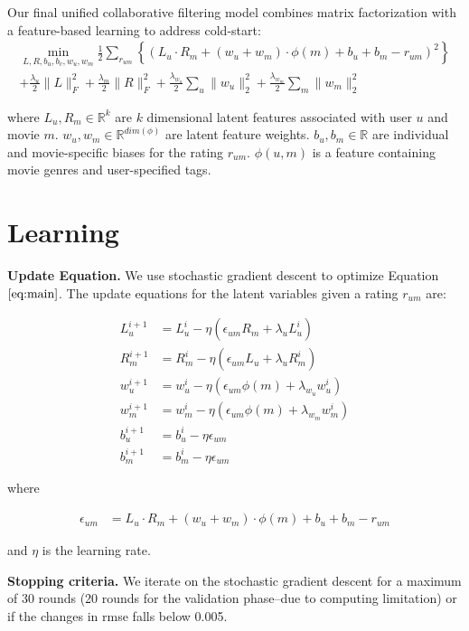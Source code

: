 \documentclass{article} %
\begin{document}
	Our final unified collaborative filtering model combines matrix factorization with a feature-based learning to address cold-start:
	\begin{multline}
	\min_{L, R, b_u, b_v, w_u, w_m} \frac{1}{2}\sum_{r_{um}} \left\{(L_u \cdot R_m + (w_u + w_m) \cdot \phi(m) + b_u + b_m - r_{um})^2\right\}\\ + \frac{\lambda_u}{2}\|L\|^2_F + \frac{\lambda_m}{2}\|R\|^2_F + \frac{\lambda_{w_u}}{2}\sum_u\|w_u\|^2_2 + \frac{\lambda_{w_m}}{2}\sum_m\|w_m\|^2_2\label{eq:main}
	\end{multline}

	where $L_u, R_m \in \mathbb{R}^k$ are $k$ dimensional latent features associated with user $u$ and movie $m$. $w_u,w_m \in \mathbb{R}^{dim(\phi)}$ are latent feature weights. $b_u, b_m \in \mathbb{R}$ are individual and movie-specific biases for the rating $r_{um}$. $\phi(u, m)$ is a feature containing movie genres and user-specified tags.

\section{Learning}

  \textbf{Update Equation.}   We use stochastic gradient descent to optimize
Equation $\ref{eq:main}$. The update equations for the latent variables given
a rating $r_{um}$ are:

	\begin{align}
	L_u^{i+1} &= L_u^{i} - \eta ( \epsilon_{um} R_m  + \lambda_u L_u^i)\\
	R_m^{i+1} &= R_m^{i} - \eta ( \epsilon_{um} L_u  + \lambda_u R_m^i)\\
	w_u^{i+1} &= w_u^{i} - \eta ( \epsilon_{um} \phi(m) + \lambda_{w_u} w_u^i)\\
	w_m^{i+1} &= w_m^{i} - \eta ( \epsilon_{um} \phi(m) + \lambda_{w_m} w_m^i)\\
	b_u^{i+1} &= b_u^{i} - \eta \epsilon_{um}\\
	b_m^{i+1} &= b_m^{i} - \eta \epsilon_{um}
	\end{align}

	where

	\begin{align}
		\epsilon_{um} &= L_u \cdot R_m + (w_u + w_m) \cdot \phi(m) + b_u + b_m - r_{um}
	\end{align}

and $\eta$ is the learning rate.

  \textbf{Stopping criteria.}   We iterate on the stochastic gradient descent
for a maximum of 30 rounds (20 rounds for the validation phase--due to
computing limitation)   or if the changes in rmse falls below 0.005.
\end{document}

